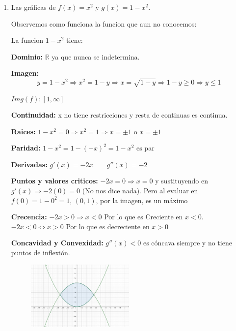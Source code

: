 \documentclass[12pt]{article}
\begin{document}
\begin{enumerate}[\hspace{9px} a)]
    \item Las gr\'aficas de \(f(x)=x^2\) y \(g(x)=1-x^2\).\bigskip
    
        Observemos como funciona la funcion que aun no conocemos:\bigskip

        La funcion \(1-x^2\) tiene: \medskip

        \textbf{Dominio: }\(\mathbb{R}\) ya que nunca se indetermina.\medskip

        \textbf{Imagen: }\medskip
        \begin{equation*}
            y=1-x^2 \Rightarrow x^2=1-y \Rightarrow x = \sqrt{1-y} \Rightarrow 1-y\geq0 \Rightarrow y\leq1
        \end{equation*}

        \(Img(f): [1,\infty]\)\medskip

        \textbf{Continuidad: } x no tiene restricciones y resta de continuas es continua.\medskip

        \textbf{Raices: }\(1-x^2=0\Rightarrow x^2=1\Rightarrow x=\pm1\) o \(x=\pm1\)\medskip

        \textbf{Paridad: }\(1-x^2 = 1-(-x)^2=1-x^2\) es par\medskip

        \textbf{Derivadas: }\(g'(x)=-2x \qquad g''(x)=-2\)\medskip

        \textbf{Puntos y valores criticos: }\(-2x=0\Rightarrow x=0\) y sustituyendo en \(g'(x)\Rightarrow -2(0)=0\) (No nos dice nada). Pero al evaluar en \(f(0)=1-0^2=1\), \((0,1)\), por la imagen, es un m\'aximo\medskip

        \textbf{Crecencia: }\(-2x>0\Rightarrow x<0\) Por lo que es Creciente en \(x<0\). \(-2x<0\Leftrightarrow x>0\) Por lo que es decreciente en \(x>0\)\medskip

        \textbf{Concavidad y Convexidad: } \(g''(x)<0\) es c\'oncava siempre y no tiene puntos de inflexi\'on.\medskip

        \begin{figure}[ht]
            \centering
            \includegraphics[width=0.5\textwidth]{7-b}
        \end{figure}


\end{enumerate}
\end{document}
